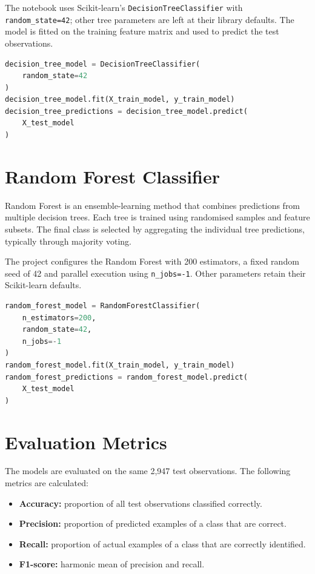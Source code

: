 The notebook uses Scikit-learn's \texttt{DecisionTreeClassifier} with \texttt{random\_state=42}; other tree parameters are left at their library defaults. The model is fitted on the training feature matrix and used to predict the test observations.

\begin{lstlisting}[language=Python,caption={Decision Tree training and prediction}]
decision_tree_model = DecisionTreeClassifier(
    random_state=42
)
decision_tree_model.fit(X_train_model, y_train_model)
decision_tree_predictions = decision_tree_model.predict(
    X_test_model
)
\end{lstlisting}

\section{Random Forest Classifier}
Random Forest is an ensemble-learning method that combines predictions from multiple decision trees. Each tree is trained using randomised samples and feature subsets. The final class is selected by aggregating the individual tree predictions, typically through majority voting.

The project configures the Random Forest with 200 estimators, a fixed random seed of 42 and parallel execution using \texttt{n\_jobs=-1}. Other parameters retain their Scikit-learn defaults.

\begin{lstlisting}[language=Python,caption={Random Forest training and prediction}]
random_forest_model = RandomForestClassifier(
    n_estimators=200,
    random_state=42,
    n_jobs=-1
)
random_forest_model.fit(X_train_model, y_train_model)
random_forest_predictions = random_forest_model.predict(
    X_test_model
)
\end{lstlisting}

\section{Evaluation Metrics}
The models are evaluated on the same 2,947 test observations. The following metrics are calculated:
\begin{itemize}
\item \textbf{Accuracy:} proportion of all test observations classified correctly.
\item \textbf{Precision:} proportion of predicted examples of a class that are correct.
\item \textbf{Recall:} proportion of actual examples of a class that are correctly identified.
\item \textbf{F1-score:} harmonic mean of precision and recall.
\end{itemize}

